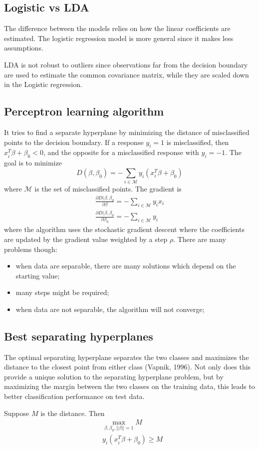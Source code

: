 \documentclass[12pt, letterpaper]{article}
\theoremstyle{definition}
\begin{document}
\subsection{Logistic vs LDA}
The difference between the models relies on how the linear coefficients are estimated. The logistic regression model is more general since it makes less assumptions.

LDA is not robust to outliers since observations far from the decision boundary are used to estimate the common covariance matrix, while they are scaled down in the Logistic regression.

\subsection{Perceptron learning algorithm}
It tries to find a separate hyperplane by minimizing the distance of misclassified points to the decision boundary. If a response $y_i = 1$ is misclassified, then $x^T_i \beta + \beta_0 < 0$, and the opposite for a misclassified response with $y_i = -1$. The goal is to minimize
\begin{equation}
D(\beta, \beta_0) = - \sum_{i\in\mathcal{M}} y_i\left(x_i^T\beta + \beta_0\right)
\end{equation}
where $\mathcal{M}$ is the set of misclassified points.
The gradient is
\begin{align}
\frac{\partial D(\beta,\beta_0}{\partial \beta} = -\sum_{i\in\mathcal{M}}y_ix_i \\
\frac{\partial D(\beta,\beta_0}{\partial \beta_0} = -\sum_{i\in\mathcal{M}} y_i
\end{align}
where the algorithm uses the stochastic gradient descent where the coefficients are updated by the gradient value weighted by a step $\rho$. There are many problems though:
\begin{itemize}
\item when data are separable, there are many solutions which depend on the starting value;
\item many steps might be required;
\item when data are not separable, the algorithm will not converge;
\end{itemize}
\subsection{Best separating hyperplanes}
The optimal separating hyperplane separates the two classes and maximizes the distance to the closest point from either class (Vapnik, 1996). Not only does this provide a unique solution to the separating hyperplane problem, but by maximizing the margin between the two classes on the training data, this leads to better classification performance on test data.

Suppose $M$ is the distance. Then
\begin{align}
&\max\limits_{\beta,\beta_0, ||\beta||=1} M \\
& y_i(x_i^T\beta + \beta_0) \ge M
\end{align}
\end{document}
